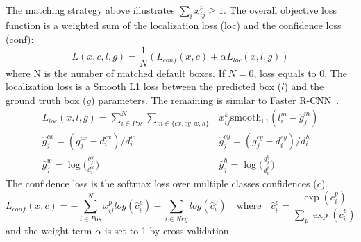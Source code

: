 \documentclass[catalog.tex]{subfiles}
\begin{document}
The matching strategy above illustrates $\sum_i x_{ij}^p \geq 1$.
The overall objective loss function is a weighted sum of the localization loss (loc) and the confidence loss (conf):
\begin{equation}
L(x, c, l, g) = \frac{1}{N}(L_{conf}(x, c) + \alpha L_{loc}(x, l, g))
\label{eq:loss}
\end{equation}
where N is the number of matched default boxes. If $N = 0$, loss equals to 0. The localization loss is a Smooth L1 loss between the predicted box ($l$) and the ground truth box ($g$) parameters. The remaining is similar to Faster R-CNN~\cite{ren2015faster}.
\begin{equation}
\begin{split}
L_{loc}(x,l,g) = \sum_{i\in Pos}^N \sum_{m\in\{cx, cy, w, h\}}& x_{ij}^k\text{smooth}_{\text{L1}}(l_i^m - \hat{g}_j^m)\\
\hat{g}_j^{cx} = (g_j^{cx} - d_i^{cx}) / d_i^w\quad\quad&
\hat{g}_j^{cy} = (g_j^{cy} - d_i^{cy}) / d_i^h\\
\hat{g}_j^{w} = \log\Big(\frac{g_j^{w}}{d_i^w}\Big)\quad\quad&
\hat{g}_j^{h} = \log\Big(\frac{g_j^{h}}{d_i^h}\Big)
\end{split}
\label{eq:locloss}
\end{equation}
The confidence loss is the softmax loss over multiple classes confidences ($c$).
\begin{equation}
L_{conf}(x, c) = - \sum_{i\in Pos}^N x_{ij}^p log(\hat{c}_i^p) - \sum_{i\in Neg} log(\hat{c}_i^0)\quad\text{where}\quad\hat{c}_i^p = \frac{\exp(c_i^p)}{\sum_p \exp(c_i^p)}
\label{eq:confloss}
\end{equation}
and the weight term $\alpha$ is set to 1 by cross validation.

\singlespacing
\printbibliography[title={References.},resetnumbers=true,heading=subbibliography]
\end{document}

